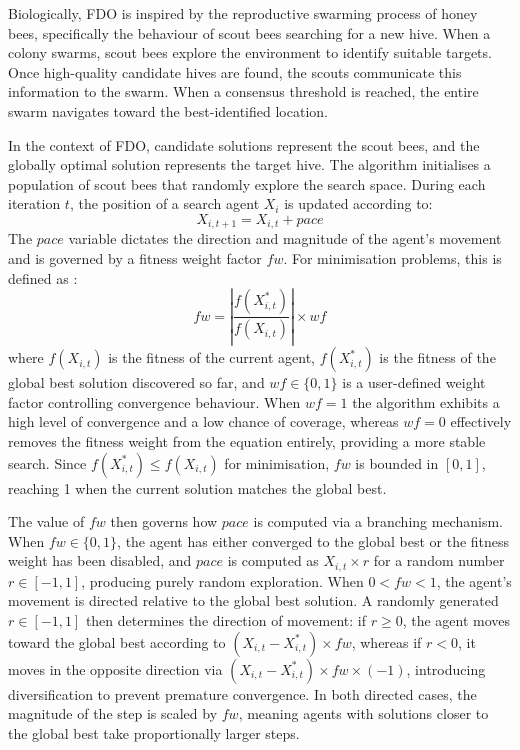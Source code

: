 \documentclass[11pt]{article}
\begin{document}
Biologically, FDO is inspired by the reproductive swarming process of honey
bees, specifically the behaviour of scout bees searching for a new hive. When
a colony swarms, scout bees explore the environment to identify suitable
targets. Once high-quality candidate hives are found, the scouts communicate
this information to the swarm. When a consensus threshold is reached, the
entire swarm navigates toward the best-identified location.

In the context of FDO, candidate solutions represent the scout bees, and the
globally optimal solution represents the target hive. The algorithm initialises
a population of scout bees that randomly explore the search space. During each
iteration $t$, the position of a search agent $X_i$ is updated according to:
$$X_{i, t+1} = X_{i, t} + pace$$
The $pace$ variable dictates the direction and magnitude of the agent's movement
and is governed by a fitness weight factor $fw$. For minimisation problems,
this is defined as \cite{abdullah}:
$$fw = \left| \frac{f(X^*_{i,t})}{f(X_{i,t})} \right| \times wf$$
where $f(X_{i,t})$ is the fitness of the current agent, $f(X^*_{i,t})$ is the
fitness of the global best solution discovered so far, and $wf \in \{0, 1\}$ is
a user-defined weight factor controlling convergence behaviour. When $wf = 1$
the algorithm exhibits a high level of convergence and a low chance of coverage,
whereas $wf = 0$ effectively removes the fitness weight from the equation
entirely, providing a more stable search. Since $f(X^*_{i,t}) \leq f(X_{i,t})$
for minimisation, $fw$ is bounded in $[0, 1]$, reaching 1 when the current
solution matches the global best.

The value of $fw$ then governs how $pace$ is computed via a branching mechanism.
When $fw \in \{0, 1\}$, the agent has either converged to the global best or
the fitness weight has been disabled, and $pace$ is computed as $X_{i,t} \times r$
for a random number $r \in [-1, 1]$, producing purely random exploration. When
$0 < fw < 1$, the agent's movement is directed relative to the global best
solution. A randomly generated $r \in [-1, 1]$ then determines the direction
of movement: if $r \geq 0$, the agent moves toward the global best according
to $(X_{i,t} - X^*_{i,t}) \times fw$, whereas if $r < 0$, it moves in the
opposite direction via $(X_{i,t} - X^*_{i,t}) \times fw \times (-1)$,
introducing diversification to prevent premature convergence. In both directed
cases, the magnitude of the step is scaled by $fw$, meaning agents with
solutions closer to the global best take proportionally larger steps.
\end{document}
